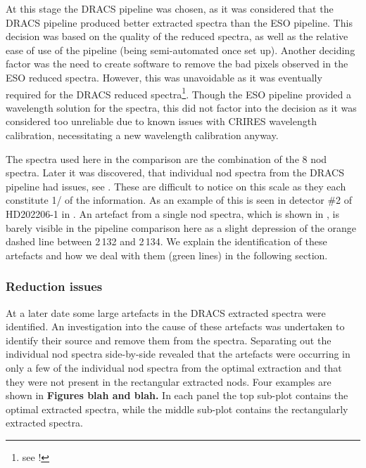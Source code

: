 At this stage the {DRACS} pipeline was chosen, as it was considered that the {DRACS} pipeline produced better extracted spectra than the {ESO} pipeline. This decision was based on the quality of the reduced spectra, as well as the relative ease of use of the pipeline (being semi-automated once set up). Another deciding factor was the need to create software to remove the bad pixels observed in the {ESO} reduced spectra. However, this was unavoidable as it was eventually required for the {DRACS} reduced spectra\footnote{see !}. Though the {ESO} pipeline provided a wavelength solution for the spectra, this did not factor into the decision as it was considered too unreliable due to known issues with {CRIRES} wavelength calibration, necessitating a new wavelength calibration anyway.

The spectra used here in the comparison are the combination of the 8 nod spectra. Later it was discovered, that individual nod spectra from the {DRACS} pipeline had issues, see . These are difficult to notice on this scale as they each constitute 1/ of the information. As an example of this is seen in detector \#2 of HD202206-1 in . An artefact from a single nod spectra, which is shown in , is barely visible in the pipeline comparison here as a slight depression of the orange dashed line between 2\,132 and 2\,134\nm{}. We explain the identification of these artefacts and how we deal with them (green lines) in the following section.

\subsubsection{Reduction issues}
\label{subsubsec:reductionartefacts}
At a later date some large artefacts in the {DRACS} extracted spectra were identified. An investigation into the cause of these artefacts was undertaken to identify their source and remove them from the spectra. Separating out the individual nod spectra side-by-side revealed that the artefacts were occurring in only a few of the individual nod spectra from the optimal extraction and that they were not present in the rectangular extracted nods. Four examples are shown in \textbf{Figures blah and blah.} In each panel the top sub-plot contains the optimal extracted spectra, while the middle sub-plot contains the rectangularly extracted spectra.


